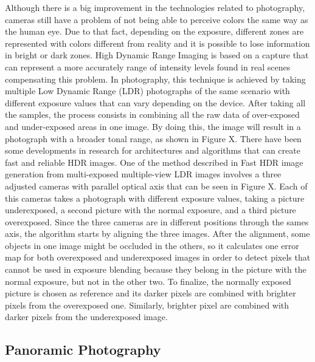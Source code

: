 Although there is a big improvement in the technologies related to photography, cameras still have a problem of not being able to perceive colors the same way as the human eye. Due to that fact, depending on the exposure, different zones are represented with colors different from reality and it is possible to lose information in bright or dark zones. High Dynamic Range Imaging is based on a capture that can represent a more accurately range of intensity levels found in real scenes compensating this problem.
In photography, this technique is achieved by taking multiple Low Dynamic Range (LDR) photographs of the same scenario with different exposure values that can vary depending on the device. After taking all the samples, the process consists in combining all the raw data of over-exposed and under-exposed areas in one image. By doing this, the image will result in a photograph with a broader tonal range, as shown in Figure X.
There have been some developments in research for architectures and algorithms that can create fast and reliable HDR images.
One of the method described in Fast HDR image generation from multi-exposed multiple-view LDR images involves a three adjusted cameras with parallel optical axis that can be seen in Figure X. Each of this cameras takes a photograph with different exposure values, taking a picture underexposed, a second picture with the normal exposure, and a third picture overexposed. 
Since the three cameras are in different positions through the sames axis, the algorithm starts by aligning the three images. After the alignment, some objects in one image might be occluded in the others, so it calculates one error map for both overexposed and underexposed images in order to detect pixels that cannot be used in exposure blending because they belong in the picture with the normal exposure, but not in the  other two.
To finalize, the normally exposed picture is chosen as reference and its darker pixels are combined with brighter pixels from the overexposed one. Similarly, brighter pixel are combined with darker pixels from the underexposed image.

\subsection{Panoramic Photography}

